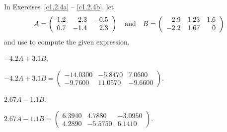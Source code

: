 \documentclass{ximera}
\begin{document}
\noindent In Exercises~\ref{c1.2.4a} -- \ref{c1.2.4b}, let 
\[
A = \left(\begin{array}{rrr} 1.2 & 2.3 & -0.5\\ 0.7 & -1.4 & 2.3
\end{array}\right) \quad\mbox{and}\quad
B = \left(\begin{array}{rrr} -2.9 & 1.23 & 1.6\\ -2.2 & 1.67 & 0
\end{array}\right)
\]
and use \Matlab to compute the given expression.
\begin{exercise}  \label{c1.2.4a}
$-4.2A+3.1B$.

\begin{solution}
$-4.2A + 3.1B = \left(\begin{array}{rrr} 
-14.0300 & -5.8470 &    7.0600 \\
 -9.7600 & 11.0570 &   -9.6600\end{array}\right)$.

\end{solution}
\end{exercise}
\begin{exercise}  \label{c1.2.4b}
$2.67A-1.1B$.

\begin{solution}
$2.67A - 1.1B = \left(\begin{array}{rrr} 
    6.3940  &  4.7880 &  -3.0950\\
    4.2890  & -5.5750 &   6.1410 \end{array}\right)$.




\end{solution}
\end{exercise}
\end{document}
